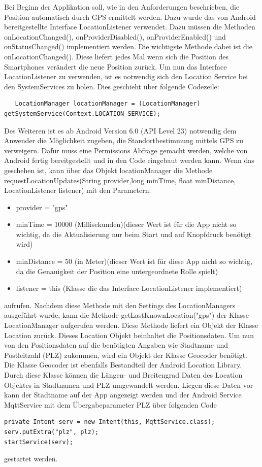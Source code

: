 Bei Beginn der Applikation soll, wie in den Anforderungen beschrieben, die Position automatisch durch GPS ermittelt werden. Dazu wurde das von Android bereitgestellte Interface LocationListener verwendet. Dazu müssen die Methoden onLocationChanged(), onProviderDisabled(), onProviderEnabled() und onStatusChanged() implementiert werden. 
Die wichtigste Methode dabei ist die onLocationChanged(). Diese liefert jedes Mal wenn sich die Position des Smartphones verändert die neue Position zurück. 
Um nun das Interface LocationListener zu verwenden, ist es notwendig sich den Location Service bei den SystemServices zu holen. Dies geschieht über folgende Codezeile:
  \begin{lstlisting}
   LocationManager locationManager = (LocationManager) getSystemService(Context.LOCATION_SERVICE);
  \end{lstlisting}
  Des Weiteren ist es ab Android Version 6.0 (API Level 23) notwendig dem Anwender die Möglichkeit zugeben, die Standortbestimmung mittels GPS zu verweigern. Dafür muss eine Permissions Abfrage gemacht werden, welche von Android fertig bereitgestellt und in den Code eingebaut werden kann. Wenn das geschehen ist, kann über das Objekt locationManager die Methode requestLocationUpdates(String provider,long minTime, float minDistance, LocationListener listener) mit den Parametern: 
    \begin{itemize}
\item provider = "gps"
\item minTime = 10000 (Millisekunden)(dieser Wert ist für die App nicht so wichtig, da die Aktualisierung nur beim Start und auf Knopfdruck benötigt wird)
\item minDistance = 50 (in Meter)(dieser Wert ist für diese App nicht so wichtig, da die Genauigkeit der Position eine untergeordnete Rolle spielt)
\item listener = this (Klasse die das Interface LocationListener implementiert)
\end{itemize}  
aufrufen. Nachdem diese Methode mit den Settings des LocationManagers ausgeführt wurde, kann die Methode getLastKnownLocation("gps") der Klasse LocationManager aufgerufen werden. Diese Methode liefert ein Objekt der Klasse Location zurück. Dieses Location Objekt beinhaltet die Positionsdaten. Um nun von den Positionsdaten auf die benötigten Angaben wie Stadtname und Postleitzahl (PLZ) zukommen, wird ein Objekt der Klasse Geocoder benötigt. Die Klasse Geocoder ist ebenfalls Bestandteil der Android Location Library. Durch diese Klasse können die Längen- und Breitengrad Daten des Location Objektes in Stadtnamen und PLZ umgewandelt werden.
Liegen diese Daten vor kann der Stadtname auf der App angezeigt werden und der Android Service MqttService mit dem Übergabeparameter PLZ über folgenden Code 
 \begin{lstlisting}
private Intent serv = new Intent(this, MqttService.class);
serv.putExtra("plz", plz); 
startService(serv);
  \end{lstlisting}
gestartet werden.
